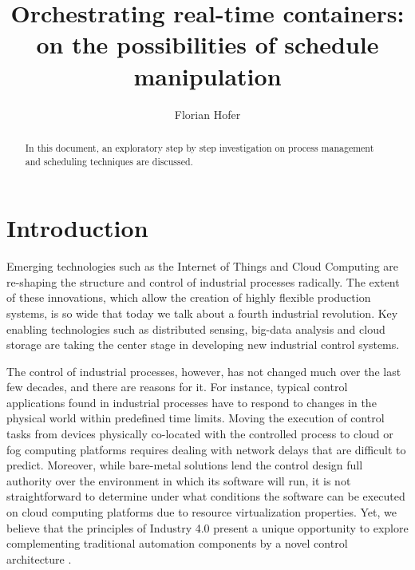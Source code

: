 \documentclass[]{scrartcl}
\title{Orchestrating real-time containers:\\ on the possibilities of schedule manipulation}
\author{Florian Hofer}
\begin{document}
\maketitle

\begin{abstract}
In this document, an exploratory step by step investigation on process management and scheduling techniques are discussed.
\end{abstract}

\section{Introduction}

Emerging technologies such as the Internet of Things and Cloud Computing are re-shaping the structure and control of industrial processes radically. 
The extent of these innovations, which allow the creation of highly flexible production systems, is so wide that today we talk about a fourth industrial revolution.
Key enabling technologies such as distributed sensing, big-data analysis and cloud storage are taking the center stage in developing new industrial control systems.

The control of industrial processes, however, has not changed much over the last few decades, and there are reasons for it.
For instance, typical control applications found in industrial processes have to respond to changes in the physical world within predefined time limits.
Moving the execution of control tasks from devices physically co-located with the controlled process to cloud or fog computing platforms requires dealing with network delays that are difficult to predict.
Moreover, while bare-metal solutions lend the control design full authority over the environment in which its software will run, it is not straightforward to determine under what conditions the software can be executed on cloud computing platforms due to resource virtualization properties.
Yet, we believe that the principles of Industry 4.0 present a unique opportunity to explore complementing traditional automation components by a novel control architecture \cite{Tascietal2018}.
\end{document}
